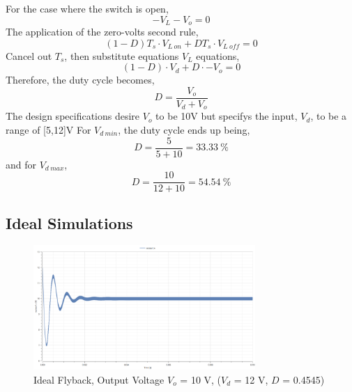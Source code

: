 \documentclass[12pt,twoside]{scrartcl}
\begin{document}
    For the case where the switch is open,
    \begin{equation}
        -V_L - V_o = 0
    \end{equation}
    The application of the zero-volts second rule,
    \begin{equation}
        (1-D)T_s \cdot V_{L \: on} + DT_s \cdot V_{L\:off} = 0
        \label{equation:zerovoltseconds}
    \end{equation}
    Cancel out $T_s$, then substitute equations $V_L$ equations,
    \begin{equation}
        (1-D) \cdot V_d+  D\cdot -V_o = 0
    \end{equation}
    Therefore, the duty cycle becomes,
    \begin{equation}
        D  = \dfrac{V_o}{V_d+V_o}
    \end{equation}
    The design specifications desire $V_o$ to be 10V but specifys the input, $V_d$, to be a range of [5,12]V
    For $V_{d\:min}$, the duty cycle ends up being,
    \begin{equation}
        D = \dfrac{5}{5+10} = 33.33\:\%
    \end{equation}
    and for $V_{d\:max}$,
    \begin{equation}
        D = \dfrac{10}{12+10} = 54.54\:\%
    \end{equation}
\newpage
\subsection{Ideal Simulations}
\begin{figure}[htp]
    \centering
    \includegraphics[width=0.75\textwidth]{IdealSim12V.png}
    \caption{Ideal Flyback, Output Voltage $V_o$ = 10 V, ($V_d$ = 12 V, $D$ = 0.4545)}
    \label{fig:IdealSim12V}
\end{figure}
\end{document}
